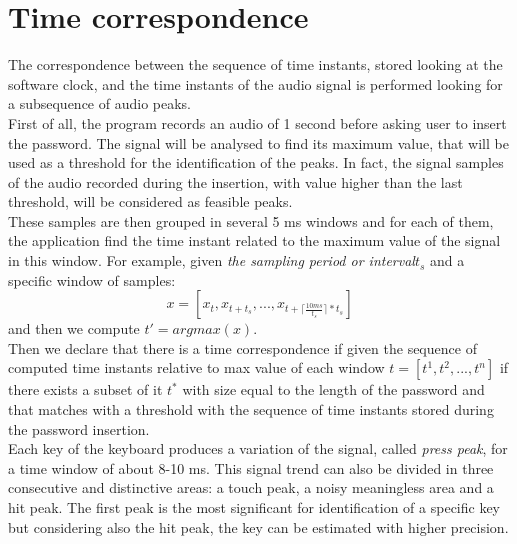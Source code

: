 \section{Time correspondence}
The correspondence between the sequence of time instants, stored looking at the software clock, and the time instants of the audio signal is performed looking for a subsequence of audio peaks. \\
First of all, the program records an audio of 1 second before asking user to insert the password. The signal will be analysed to find its maximum value, that will be used as a threshold for the identification of the peaks. In fact, the signal samples of the audio recorded during the insertion, with value higher than the last threshold, will be considered as feasible peaks.\\
These samples are then grouped in several 5 ms windows and for each of them, the application find the time instant related to the maximum value of the signal in this window. For example, given \textit{the sampling period or interval}$t_s$ and a specific window of samples: $$x = [x_t, x_{t+t_s}, ..., x_{t+\lceil \frac{10ms}{t_s}\rceil * t_s}]$$
and then we compute $t'= argmax(x)$.\\
Then we declare that there is a time correspondence if given the sequence of computed time instants relative to max value of each window $t=[t^1, t^2, ..., t^n]$ if there exists a subset of it $t^{*}$ with size equal to the length of the password and that matches with a threshold with the sequence of time instants stored during the password insertion.\\
Each key of the keyboard produces a variation of the signal, called \textit{press peak}, for a time window of about 8-10 ms\cite{keyboard_acoustic}. This signal trend can also be divided in three consecutive and distinctive areas: a touch peak, a noisy meaningless area and a hit peak. The first peak is the most significant for identification of a specific key but considering also the hit peak, the key can be estimated with higher precision.\\